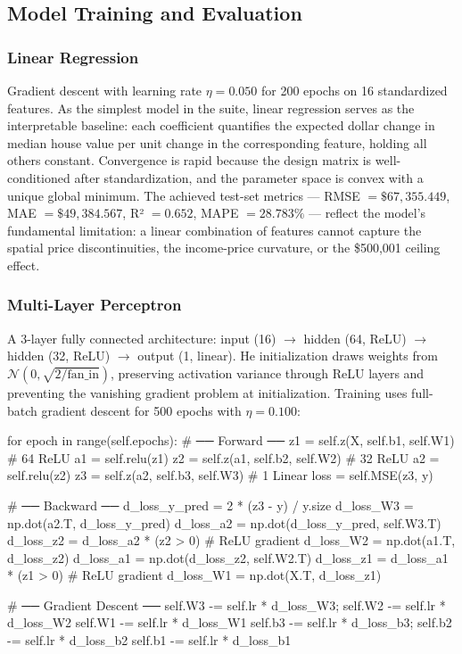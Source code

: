 \subsection{Model Training and Evaluation}

\subsubsection{Linear Regression}
Gradient descent with learning rate $\eta = 0.050$ for 200 epochs on 16 standardized features. As the simplest model in the suite, linear regression serves as the interpretable baseline: each coefficient quantifies the expected dollar change in median house value per unit change in the corresponding feature, holding all others constant. Convergence is rapid because the design matrix is well-conditioned after standardization, and the parameter space is convex with a unique global minimum. The achieved test-set metrics — RMSE $= \$67{,}355.449$, MAE $= \$49{,}384.567$, R² $= 0.652$, MAPE $= 28.783\%$ — reflect the model's fundamental limitation: a linear combination of features cannot capture the spatial price discontinuities, the income-price curvature, or the \$500,001 ceiling effect.

\subsubsection{Multi-Layer Perceptron}
A 3-layer fully connected architecture: input (16) $\rightarrow$ hidden (64, ReLU) $\rightarrow$ hidden (32, ReLU) $\rightarrow$ output (1, linear). He initialization draws weights from $\mathcal{N}(0, \sqrt{2/\text{fan\_in}})$, preserving activation variance through ReLU layers and preventing the vanishing gradient problem at initialization. Training uses full-batch gradient descent for 500 epochs with $\eta = 0.100$:

\begin{pythoncode}[caption={MLP: 3-layer forward pass, MSE loss, backpropagation}]
for epoch in range(self.epochs):
    # ── Forward ──
    z1 = self.z(X, self.b1, self.W1)     # 64 ReLU
    a1 = self.relu(z1)
    z2 = self.z(a1, self.b2, self.W2)    # 32 ReLU
    a2 = self.relu(z2)
    z3 = self.z(a2, self.b3, self.W3)    # 1 Linear
    loss = self.MSE(z3, y)
    
    # ── Backward ──
    d_loss_y_pred = 2 * (z3 - y) / y.size
    d_loss_W3 = np.dot(a2.T, d_loss_y_pred)
    d_loss_a2 = np.dot(d_loss_y_pred, self.W3.T)
    d_loss_z2 = d_loss_a2 * (z2 > 0)     # ReLU gradient
    d_loss_W2 = np.dot(a1.T, d_loss_z2)
    d_loss_a1 = np.dot(d_loss_z2, self.W2.T)
    d_loss_z1 = d_loss_a1 * (z1 > 0)     # ReLU gradient
    d_loss_W1 = np.dot(X.T, d_loss_z1)
    
    # ── Gradient Descent ──
    self.W3 -= self.lr * d_loss_W3;  self.W2 -= self.lr * d_loss_W2
    self.W1 -= self.lr * d_loss_W1
    self.b3 -= self.lr * d_loss_b3;  self.b2 -= self.lr * d_loss_b2
    self.b1 -= self.lr * d_loss_b1
\end{pythoncode}


